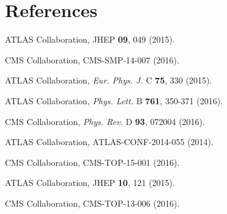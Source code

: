 \documentclass{blois}
\def\Journal#1#2#3#4{{#1} {\bf #2}, #3 (#4)}
\def\PLB{{\em Phys. Lett.}  B}
\def\PRD{{\em Phys. Rev.} D}
\def\EPJC{{\em Eur. Phys. J.} C}
\begin{document}
\section*{References}

\begin{thebibliography}{99}

ATLAS Collaboration, \Journal{JHEP}{09}{049}{2015}.

CMS Collaboration, CMS-SMP-14-007 (2016).

ATLAS Collaboration, \Journal{\EPJC}{75}{330}{2015}.

ATLAS Collaboration, \Journal{\PLB}{761}{350-371}{2016}.

CMS Collaboration, \Journal{\PRD}{93}{072004}{2016}.

ATLAS Collaboration, ATLAS-CONF-2014-055 (2014).

CMS Collaboration, CMS-TOP-15-001 (2016).

ATLAS Collaboration, \Journal{JHEP}{10}{121}{2015}.

CMS Collaboration, CMS-TOP-13-006 (2016).

\end{thebibliography}
\end{document}
